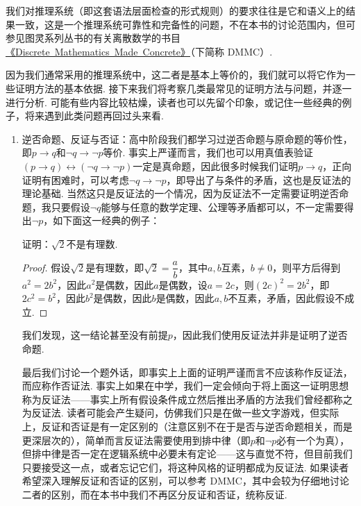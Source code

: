 我们对推理系统（即这套语法层面检查的形式规则）的要求往往是它和语义上的结果一致，这是一个推理系统可靠性和完备性的问题，不在本书的讨论范围内，但可参见图灵系列丛书的有关离散数学的书目\href{https://github.com/FrightenedFoxCN/Discrete-Mathematics-Made-Concrete}{《Discrete\ Mathematics\ Made\ Concrete》}（下简称 DMMC）.

因为我们通常采用的推理系统中，这二者是基本上等价的，我们就可以将它作为一些证明方法的基本依据. 接下来我们将考察几类最常见的证明方法与问题，并逐一进行分析. 可能有些内容比较枯燥，读者也可以先留个印象，或记住一些经典的例子，将来遇到此类问题再回过头来看.

\begin{enumerate}
    \item 逆否命题、反证与否证：高中阶段我们都学习过逆否命题与原命题的等价性，即$p\to q$和$\lnot q\to\lnot p$等价. 事实上严谨而言，我们也可以用真值表验证$(p\to q)\leftrightarrow(\lnot q\to\lnot p)$一定是真命题，因此很多时候我们证明$p\to q$，正向证明有困难时，可以考虑$\lnot q\to\lnot p$，即导出了与条件的矛盾，这也是反证法的理论基础. 当然这只是反证法的一个情况，因为反证法不一定需要证明逆否命题，我只要假设$\lnot q$能够与任意的数学定理、公理等矛盾都可以，不一定需要得出$\lnot p$，如下面这一经典的例子：

          \begin{example}
              证明：$\sqrt{2}$不是有理数.
          \end{example}
          \begin{proof}
              假设$\sqrt{2}$是有理数，即$\sqrt{2}=\dfrac{a}{b}$，其中$a,b$互素，$b\neq 0$，则平方后得到$a^2=2b^2$，因此$a^2$是偶数，因此$a$是偶数，设$a=2c$，则$(2c)^2=2b^2$，即$2c^2=b^2$，因此$b^2$是偶数，因此$b$是偶数，因此$a,b$不互素，矛盾，因此假设不成立.
          \end{proof}

          我们发现，这一结论甚至没有前提$p$，因此我们使用反证法并非是证明了逆否命题.

          最后我们讨论一个题外话，即事实上上面的证明严谨而言不应该称作反证法，而应称作否证法. 事实上如果在中学，我们一定会倾向于将上面这一证明思想称为反证法——事实上所有假设条件成立然后推出矛盾的方法我们曾经都称之为反证法. 读者可能会产生疑问，仿佛我们只是在做一些文字游戏，但实际上，反证和否证是有一定区别的（注意区别不在于是否与逆否命题相关，而是更深层次的），简单而言反证法需要使用到排中律（即$p$和$\lnot p$必有一个为真），但排中律是否一定在逻辑系统中必要未有定论——这与直觉不符，但目前我们只要接受这一点，或者忘记它们，将这种风格的证明都成为反证法. 如果读者希望深入理解反证和否证的区别，可以参考 DMMC，其中会较为仔细地讨论二者的区别，而在本书中我们不再区分反证和否证，统称反证.


\end{enumerate}
